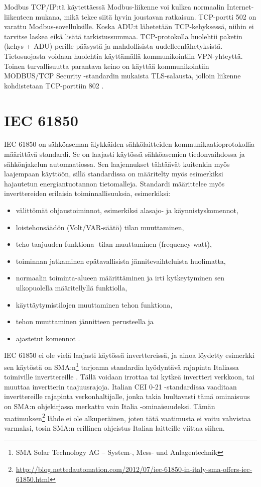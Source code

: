     Modbus TCP/IP:tä käytettäessä Modbus-liikenne voi kulkea normaalin Internet-liikenteen mukana, mikä tekee siitä hyvin joustavan ratkaisun. TCP-portti 502 on varattu Modbus-sovelluksille. \parencite{modbusTCPIPSpec} Koska ADU:t lähetetään TCP-kehyksessä, niihin ei tarvitse laskea eikä lisätä tarkistussummaa. TCP-protokolla huolehtii paketin (kehys + ADU) perille pääsystä ja mahdollisista uudelleenlähetyksistä. Tietosuojasta voidaan huolehtia käyttämällä kommunikointiin \gls{VPN}-yhteyttä. Toinen turvallisuutta parantava keino on käyttää kommunikointiin MODBUS/TCP Security -standardin mukaista TLS-salausta, jolloin liikenne kohdistetaan TCP-porttiin 802 \parencite{modbusTCPIPTLSSpec}.

\section{IEC 61850}
  \gls{IEC} 61850 on sähköaseman älykkäiden sähkölaitteiden kommunikaatioprotokollia määrittävä standardi. Se on laajasti käytössä sähköasemien tiedonvaihdossa ja sähkönjakelun automaatiossa. Sen laajennukset tähtäävät kuitenkin myös laajempaan käyttöön, sillä standardissa on määritelty myös esimerkiksi hajautetun energiantuotannon tietomalleja. Standardi määrittelee myös inverttereiden erilaisia toiminnallisuuksia, esimerkiksi:
    \begin{itemize}
      \item välittömät ohjaustoiminnot, esimerkiksi alasajo- ja käynnistyskomennot,
      \item loistehonsäädön (Volt/VAR-säätö) tilan muuttaminen,
      \item teho taajuuden funktiona -tilan muuttaminen (frequency-watt),
      \item toiminnan jatkaminen epätavallisista jännitevaihteluista huolimatta,
      \item normaalin toiminta-alueen määrittäminen ja irti kytkeytyminen sen ulkopuolella määritellyllä funktiolla,
      \item käyttäytymistilojen muuttaminen tehon funktiona,
      \item tehon muuttaminen jännitteen perusteella ja
      \item ajastetut komennot \parencite{61850funcs}.
    \end{itemize}

  IEC 61850 ei ole vielä laajasti käytössä inverttereissä, ja ainoa löydetty esimerkki sen käytöstä on SMA:n\footnote{SMA Solar Technology AG -- System-, Mess- und Anlagentechnik} tarjoama standardia hyödyntävä rajapinta Italiassa toimiville inverttereille \parencite{SMAManual}. Tällä voidaan irrottaa tai kytkeä invertteri verkkoon, tai muuttaa invertterin taajuusrajoja. Italian CEI 0-21 -standardissa vaaditaan inverttereille rajapinta verkonhaltijalle, jonka takia luultavasti tämä ominaisuus on SMA:n ohjekirjassa merkattu vain Italia -ominaisuudeksi. Tämän vaatimuksen\footnote{\url{http://blog.nettedautomation.com/2012/07/iec-61850-in-italy-sma-offers-iec-61850.html}} lähde ei ole alkuperäinen, joten tätä vaatimusta ei voitu vahvistaa varmaksi, tosin SMA:n erillinen ohjeistus Italian laitteille viittaa siihen.


